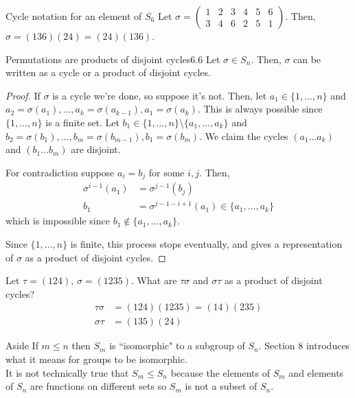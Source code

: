 \documentclass[12pt]{article}
\begin{document}
	\begin{myex}{Cycle notation for an element of $S_6$}{}
		Let $\sigma=\begin{pmatrix}1&2&3&4&5&6\\3&4&6&2&5&1\end{pmatrix}$. Then, $\sigma=(136)(24)=(24)(136)$.
	\end{myex}
	
	\begin{mythm}{Permutations are products of disjoint cycles}{6.6}
		Let $\sigma\in S_n$. Then, $\sigma$ can be written as a cycle or a product of disjoint cycles.
		\begin{proof}
			If $\sigma$ is a cycle we're done, so suppose it's not. Then, let $a_1\in\{1, \dots, n\}$ and $a_2=\sigma(a_1), \dots, a_k=\sigma(a_{k-1}), a_1=\sigma(a_k)$. This is always possible since $\{1, \dots, n\}$ is a finite set. Let $b_1\in\{1, \dots, n\}\setminus\{a_1, \dots, a_k\}$ and $b_2=\sigma(b_1), \dots, b_m=\sigma(b_{m-1}), b_1=\sigma(b_m)$. We claim the cycles $(a_1\dots a_k)$ and $(b_1\dots b_m)$ are disjoint.
			
			For contradiction suppose $a_i=b_j$ for some $i, j$. Then,
			\begin{align*}
				\sigma^{i-1}(a_1)&=\sigma^{j-1}(b_j)\\
				b_1&=\sigma^{j-1-i+1}(a_1)\in\{a_1, \dots, a_k\}
			\end{align*}
			which is impossible since $b_1\notin\{a_1, \dots, a_k\}$.
			
			Since $\{1, \dots, n\}$ is finite, this process stops eventually, and gives a representation of $\sigma$ as a product of disjoint cycles.
		\end{proof}
	\end{mythm}
	
	\begin{myex}{}{}
		Let $\tau=(124)$, $\sigma=(1235)$. What are $\tau\sigma$ and $\sigma\tau$ as a product of disjoint cycles?
		\begin{align*}
			\tau\sigma&=(124)(1235)=(14)(235)\\
			\sigma\tau&=(135)(24)
		\end{align*}
	\end{myex}
	
	\begin{myrem}{Aside}{}
		If $m\leq n$ then $S_m$ is ``isomorphic" to a subgroup of $S_n$. Section 8 introduces what it means for groups to be isomorphic.\\
		
		It is not technically true that $S_m\leq S_n$ because the elements of $S_m$ and elements of $S_n$ are functions on different sets so $S_m$ is not a subset of $S_n$.
	\end{myrem}
	
\end{document}
